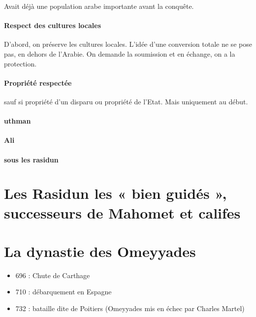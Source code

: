 \begin{Ex}
    Avait déjà une population arabe importante avant la conquête. 
\end{Ex}

\paragraph{Respect des cultures locales} D'abord, on préserve les cultures locales. L'idée d'une conversion totale ne se pose pas, en dehors de l'Arabie. On demande la soumission et en échange, on a la protection. 

\paragraph{Propriété respectée} sauf si propriété d'un disparu ou propriété de l'Etat. Mais uniquement au début. 

\paragraph{uthman}

\paragraph{Ali}

\paragraph{sous les rasidun}


\section{Les Rasidun les « bien guidés », successeurs de Mahomet et califes}

 
\section{La dynastie des Omeyyades}
\paragraph{}
\begin{itemize}
   \item 	696 : Chute de Carthage
\item 	710 : débarquement en Espagne
\item 	732 : bataille dite de Poitiers (Omeyyades mis en échec par Charles Martel)
\end{itemize}



